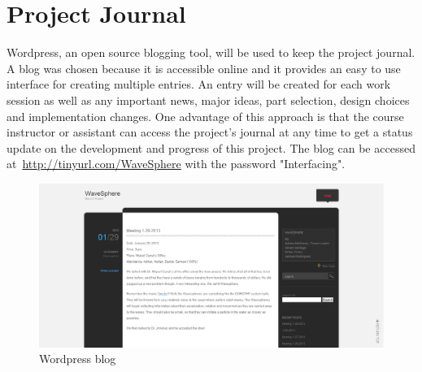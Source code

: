 \section{Project Journal}
Wordpress, an open source blogging tool, will be used to keep the project journal. A blog was chosen because it is accessible online and it provides an easy to use interface for creating multiple entries. An entry will be created for each work session as well as any important news, major ideas, part selection, design choices and implementation changes.  One advantage of this approach is that the course instructor or assistant can access the project's journal at any time to get a status update on the development and progress of this project.  The blog can be accessed at~\url{http://tinyurl.com/WaveSphere} with the password "Interfacing".

\begin{figure}[H]
	\centering
	\includegraphics[scale=0.4]{img/projectJournalScreen.PNG}
	\caption{Wordpress blog \label{fig:projectJournalScreen}}
\end{figure}

